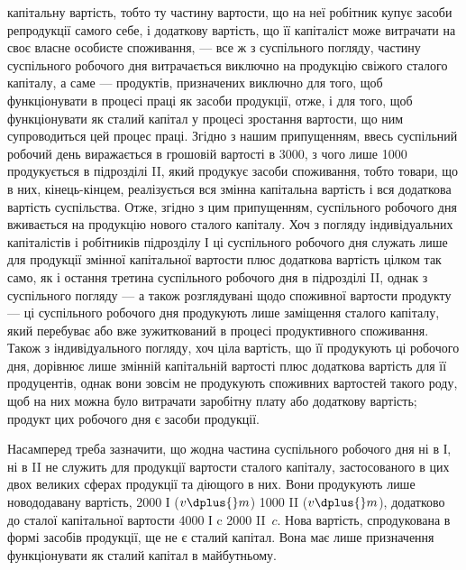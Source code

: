 \parcont{}  %
капітальну вартість, тобто ту частину вартости, що на неї робітник купує
засоби репродукції самого себе, і додаткову вартість, що її капіталіст
може витрачати на своє власне особисте споживання, — все ж з суспільного
погляду, частину суспільного робочого дня витрачається виключно на
продукцію свіжого сталого капіталу, а саме — продуктів, призначених
виключно для того, щоб функціонувати в процесі праці як засоби
продукції, отже, і для того, щоб функціонувати як сталий капітал у
процесі зростання вартости, що ним супроводиться цей процес праці.
Згідно з нашим припущенням, ввесь суспільний робочий день виражається в
грошовій вартості в 3000, з чого лише  \deq{} 1000 продукується в підрозділі
II, який продукує засоби споживання, тобто товари, що в них, кінець-кінцем,
реалізується вся змінна капітальна вартість і вся додаткова вартість
суспільства. Отже, згідно з цим припущенням,  суспільного робочого
дня вживається на продукцію нового сталого капіталу. Хоч з погляду
індивідуальних капіталістів і робітників підрозділу І ці  суспільного
робочого дня служать лише для продукції змінної капітальної вартости
плюс додаткова вартість цілком так само, як і остання третина суспільного
робочого дня в підрозділі II, однак з суспільного погляду — а
також розглядувані щодо споживної вартости продукту — ці  суспільного
робочого дня продукують лише заміщення сталого капіталу, який
перебуває або вже зужиткований в процесі продуктивного споживання.
Також з індивідуального погляду, хоч ціла вартість, що її продукують ці
 робочого дня, дорівнює лише змінній капітальній вартості плюс додаткова
вартість для її продуцентів, однак вони зовсім не продукують
споживних вартостей такого роду, щоб на них можна було витрачати
заробітну плату або додаткову вартість; продукт цих  робочого дня є
засоби продукції.

Насамперед треба зазначити, що жодна частина суспільного робочого
дня ні в І, ні в II не служить для продукції вартости сталого капіталу,
застосованого в цих двох великих сферах продукції та діющого в них.
Вони продукують лише новододавану вартість, 2000 І ($v \dplus{} m$) \dplus{} 1000
II ($v \dplus{} m$), додатково до сталої капітальної вартости \deq{} 4000 І c \dplus{} 2000
II~$c$. Нова вартість, спродукована в формі засобів продукції, ще не є
сталий капітал. Вона має лише призначення функціонувати як сталий
капітал в майбутньому.

